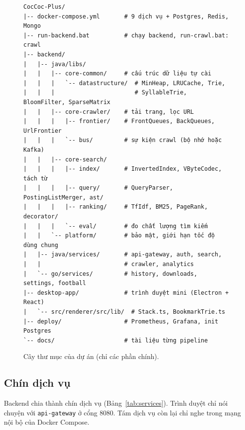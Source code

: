 \documentclass[9pt,twocolumn,a4paper]{extarticle}
\newcommand{\code}[1]{\texttt{#1}}
\begin{document}
\begin{figure}[H]
\centering
\begin{Verbatim}[fontsize=\fontsize{5.6}{6.6}\selectfont,frame=single]
CocCoc-Plus/
|-- docker-compose.yml       # 9 dịch vụ + Postgres, Redis, Mongo
|-- run-backend.bat          # chạy backend, run-crawl.bat: crawl
|-- backend/
|   |-- java/libs/
|   |   |-- core-common/     # cấu trúc dữ liệu tự cài
|   |   |   `-- datastructure/  # MinHeap, LRUCache, Trie,
|   |   |                       # SyllableTrie, BloomFilter, SparseMatrix
|   |   |-- core-crawler/    # tải trang, lọc URL
|   |   |   |-- frontier/    # FrontQueues, BackQueues, UrlFrontier
|   |   |   `-- bus/         # sự kiện crawl (bộ nhớ hoặc Kafka)
|   |   |-- core-search/
|   |   |   |-- index/       # InvertedIndex, VByteCodec, tách từ
|   |   |   |-- query/       # QueryParser, PostingListMerger, ast/
|   |   |   |-- ranking/     # TfIdf, BM25, PageRank, decorator/
|   |   |   `-- eval/        # đo chất lượng tìm kiếm
|   |   `-- platform/        # bảo mật, giới hạn tốc độ dùng chung
|   |-- java/services/       # api-gateway, auth, search,
|   |                        # crawler, analytics
|   `-- go/services/         # history, downloads, settings, football
|-- desktop-app/             # trình duyệt mini (Electron + React)
|   `-- src/renderer/src/lib/  # Stack.ts, BookmarkTrie.ts
|-- deploy/                  # Prometheus, Grafana, init Postgres
`-- docs/                    # tài liệu từng pipeline
\end{Verbatim}
\caption{Cây thư mục của dự án (chỉ các phần chính).}
\label{fig:tree}
\end{figure}

\subsection{Chín dịch vụ}
Backend chia thành chín dịch vụ (Bảng~\ref{tab:services}). Trình duyệt chỉ nói chuyện với \code{api-gateway} ở cổng 8080. Tám dịch vụ còn lại chỉ nghe trong mạng nội bộ của Docker Compose.
\end{document}
